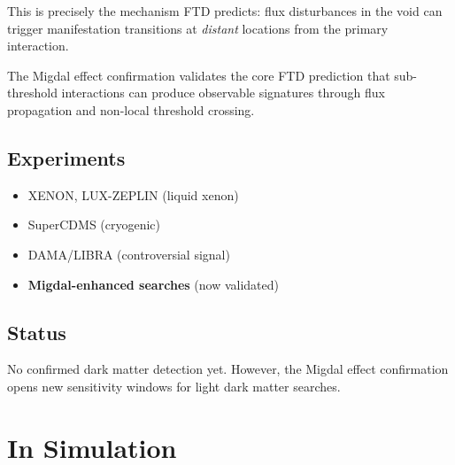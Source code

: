 \documentclass[
  11pt,
  letterpaper,
  twoside,
  openright]{book}
\providecommand{\tightlist}{%
  \setlength{\itemsep}{0pt}\setlength{\parskip}{0pt}}
\begin{document}
This is precisely the mechanism FTD predicts: flux disturbances in the
void can trigger manifestation transitions at \emph{distant} locations
from the primary interaction.

\begin{tcolorbox}[enhanced jigsaw, coltitle=black, colbacktitle=quarto-callout-note-color!10!white, toprule=.15mm, colframe=quarto-callout-note-color-frame, arc=.35mm, opacityback=0, bottomtitle=1mm, toptitle=1mm, breakable, colback=white, titlerule=0mm, opacitybacktitle=0.6, title=\textcolor{quarto-callout-note-color}{\faInfo}\hspace{0.5em}{Validation of FTD Detection Mechanism}, rightrule=.15mm, bottomrule=.15mm, leftrule=.75mm, left=2mm]

The Migdal effect confirmation validates the core FTD prediction that
sub-threshold interactions can produce observable signatures through
flux propagation and non-local threshold crossing.

\end{tcolorbox}

\subsection{Experiments}\label{experiments-29}

\begin{itemize}
\tightlist
\item
  XENON, LUX-ZEPLIN (liquid xenon)
\item
  SuperCDMS (cryogenic)
\item
  DAMA/LIBRA (controversial signal)
\item
  \textbf{Migdal-enhanced searches} (now validated)
\end{itemize}

\subsection{Status}\label{status}

No confirmed dark matter detection yet. However, the Migdal effect
confirmation opens new sensitivity windows for light dark matter
searches.

\section{In Simulation}\label{in-simulation-19}
\end{document}
